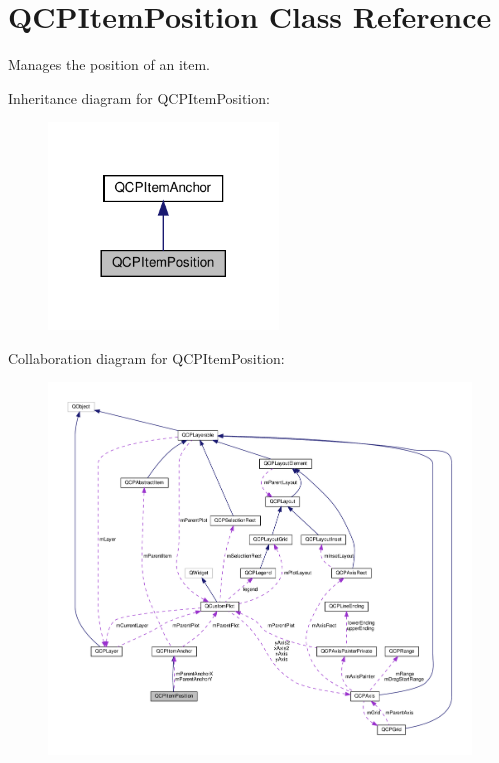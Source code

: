 \hypertarget{classQCPItemPosition}{}\section{Q\+C\+P\+Item\+Position Class Reference}
\label{classQCPItemPosition}


Manages the position of an item.  




Inheritance diagram for Q\+C\+P\+Item\+Position\+:\nopagebreak
\begin{figure}[H]
\begin{center}
\leavevmode
\includegraphics[width=173pt]{classQCPItemPosition__inherit__graph}
\end{center}
\end{figure}


Collaboration diagram for Q\+C\+P\+Item\+Position\+:\nopagebreak
\begin{figure}[H]
\begin{center}
\leavevmode
\includegraphics[width=350pt]{classQCPItemPosition__coll__graph}
\end{center}
\end{figure}
